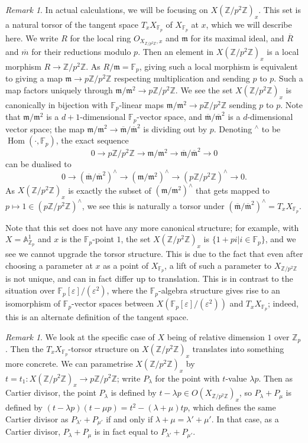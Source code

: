 \documentclass[12pt]{article}
\newcommand{\A}{\mathbb{A}}
\newcommand{\Z}{\mathbb{Z}}
\newcommand{\F}{\mathbb{F}}
\newcommand{\m}{\mathfrak{m}}
\DeclareMathOperator{\Hom}{Hom}
\theoremstyle{plain}
\theoremstyle{definition}
\theoremstyle{remark}
\newtheorem{rem}[thm]{Remark} %
\begin{document}
\begin{rem}
\label{rem:torsortangentspace}
In actual calculations, we will be focusing on $X(\Z/p^2\Z)_x$. This set is a natural torsor of the tangent space $T_x X_{\F_p}$ of $X_{\F_p}$ at $x$, which we will describe here. We write $R$ for the local ring $O_{X_{\Z/p^2\Z},x}$ and $\m$ for its maximal ideal, and $\overline{R}$ and $\overline{m}$ for their reductions modulo $p$. Then an element in $X(\Z/p^2\Z)_x$ is a local morphism $R \to \Z/p^2\Z$. As $R/\m = \F_p$, giving such a local morphism is equivalent to giving a map $\m \to p\Z/p^2\Z$ respecting multiplication and sending $p$ to $p$. Such a map factors uniquely through $\m/\m^2 \to p\Z/p^2\Z$. We see the set $X(\Z/p^2\Z)_x$ is canonically in bijection with $\F_p$-linear maps $\m/\m^2 \to p\Z/p^2\Z$ sending $p$ to $p$. Note that $\m/\m^2$ is a $d+1$-dimensional $\F_p$-vector space, and $\overline{\m}/\overline{\m}^2$ is a $d$-dimensional vector space; the map $\m/\m^2 \to \overline{\m}/\overline{\m}^2$ is dividing out by $p$. Denoting ${}^\wedge$ to be $\Hom(\cdot,\F_p)$, the exact sequence
\[
0 \to p\Z/p^2\Z \to \m/\m^2 \to \overline{\m}/\overline{\m}^2 \to 0
\]
can be dualised to
\[
0 \to (\overline{\m}/\overline{\m}^2)^\wedge \to (\m/\m^2)^\wedge \to (p\Z/p^2\Z)^{\wedge} \to 0.
\]
As $X(\Z/p^2\Z)_x$ is exactly the subset of $(\m/\m^2)^\wedge$ that gets mapped to $p \mapsto 1 \in (p\Z/p^2\Z)^{\wedge}$, we see this is naturally a torsor under $(\overline{\m}/\overline{\m}^2)^\wedge = T_{x} X_{\F_p}$.

Note that this set does not have any more canonical structure; for example, with $X = \A^1_{\Z_p}$ and $x$ is the $\F_p$-point $1$, the set $X(\Z/p^2\Z)_x$ is $\{1 + pi | i \in \F_p\}$, and we see we cannot upgrade the torsor structure. This is due to the fact that even after choosing a parameter at $x$ as a point of $X_{\F_p}$, a lift of such a parameter to $X_{\Z/p^2\Z}$ is not unique, and can in fact differ up to translation. This is in contrast to the situation over $\F_p[\varepsilon]/(\varepsilon^2)$, where the $\F_p$-algebra structure gives rise to an isomorphism of $\F_p$-vector spaces between $X(\F_p[\varepsilon]/(\varepsilon^2))$ and $T_x X_{\F_p}$; indeed, this is an alternate definition of the tangent space.
\end{rem}

\begin{rem}
\label{rem:cartierlinear}
We look at the specific case of $X$ being of relative dimension $1$ over $\Z_p$. Then the $T_x X_{\F_p}$-torsor structure on $X(\Z/p^2\Z)_x$ translates into something more concrete. We can parametrise $X(\Z/p^2\Z)_x$ by $t = t_1 : X(\Z/p^2\Z)_x \to p\Z/p^2\Z$; write $P_{\lambda}$ for the point with $t$-value $\lambda p$. Then as Cartier divisor, the point $P_{\lambda}$ is defined by $t - \lambda p \in O(X_{\Z/p^2\Z})_x$, so $P_{\lambda} + P_{\mu}$ is defined by $(t-\lambda p)(t-\mu p) = t^2 - (\lambda + \mu)tp$, which defines the same Cartier divisor as $P_{\lambda'} + P_{\mu'}$ if and only if $\lambda + \mu = \lambda' + \mu'$. In that case, as a Cartier divisor, $P_{\lambda} + P_{\mu}$ is in fact equal to $P_{\lambda'} + P_{\mu'}$.
\end{rem}
\end{document}
